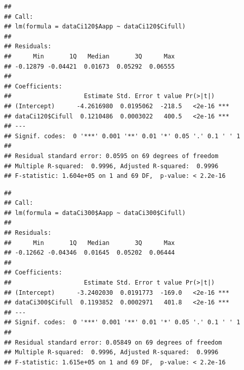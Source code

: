 \documentclass[
]{krantz}
\makeatletter
\newenvironment{Shaded}{\begin{snugshade}}{\end{snugshade}}
\newcommand{\DecValTok}[1]{\textcolor[rgb]{0.00,0.00,0.81}{#1}}
\newcommand{\KeywordTok}[1]{\textcolor[rgb]{0.13,0.29,0.53}{\textbf{#1}}}
\newcommand{\NormalTok}[1]{#1}
\newcommand{\OperatorTok}[1]{\textcolor[rgb]{0.81,0.36,0.00}{\textbf{#1}}}
\newcommand{\StringTok}[1]{\textcolor[rgb]{0.31,0.60,0.02}{#1}}
\newenvironment{kframe}{%
\medskip{}
\setlength{\fboxsep}{.8em}
 \def\at@end@of@kframe{}%
 \ifinner\ifhmode%
  \def\at@end@of@kframe{\end{minipage}}%
  \begin{minipage}{\columnwidth}%
 \fi\fi%
 \def\FrameCommand##1{\hskip\@totalleftmargin \hskip-\fboxsep
 \colorbox{shadecolor}{##1}\hskip-\fboxsep
     \hskip-\linewidth \hskip-\@totalleftmargin \hskip\columnwidth}%
 \MakeFramed {\advance\hsize-\width
   \@totalleftmargin\z@ \linewidth\hsize
   \@setminipage}}%
 {\par\unskip\endMakeFramed%
 \at@end@of@kframe}
\renewenvironment{Shaded}{\begin{kframe}}{\end{kframe}}
\makeatother
\begin{document}
\begin{verbatim}
## 
## Call:
## lm(formula = dataCi120$Aapp ~ dataCi120$Cifull)
## 
## Residuals:
##      Min       1Q   Median       3Q      Max 
## -0.12879 -0.04421  0.01673  0.05292  0.06555 
## 
## Coefficients:
##                    Estimate Std. Error t value Pr(>|t|)    
## (Intercept)      -4.2616980  0.0195062  -218.5   <2e-16 ***
## dataCi120$Cifull  0.1210486  0.0003022   400.5   <2e-16 ***
## ---
## Signif. codes:  0 '***' 0.001 '**' 0.01 '*' 0.05 '.' 0.1 ' ' 1
## 
## Residual standard error: 0.0595 on 69 degrees of freedom
## Multiple R-squared:  0.9996, Adjusted R-squared:  0.9996 
## F-statistic: 1.604e+05 on 1 and 69 DF,  p-value: < 2.2e-16
\end{verbatim}

\begin{Shaded}
\end{Shaded}

\begin{verbatim}
## 
## Call:
## lm(formula = dataCi300$Aapp ~ dataCi300$Cifull)
## 
## Residuals:
##      Min       1Q   Median       3Q      Max 
## -0.12662 -0.04346  0.01645  0.05202  0.06444 
## 
## Coefficients:
##                    Estimate Std. Error t value Pr(>|t|)    
## (Intercept)      -3.2402030  0.0191773  -169.0   <2e-16 ***
## dataCi300$Cifull  0.1193852  0.0002971   401.8   <2e-16 ***
## ---
## Signif. codes:  0 '***' 0.001 '**' 0.01 '*' 0.05 '.' 0.1 ' ' 1
## 
## Residual standard error: 0.05849 on 69 degrees of freedom
## Multiple R-squared:  0.9996, Adjusted R-squared:  0.9996 
## F-statistic: 1.615e+05 on 1 and 69 DF,  p-value: < 2.2e-16
\end{verbatim}
\end{document}
